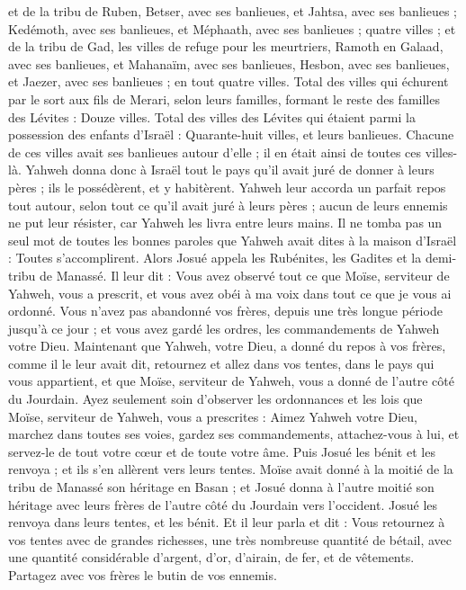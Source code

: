 \begin{multicols}{2}
et de la tribu de Ruben, Betser, avec ses banlieues, et Jahtsa, avec ses banlieues ;
Kedémoth, avec ses banlieues, et Méphaath, avec ses banlieues ; quatre villes ;
et de la tribu de Gad, les villes de refuge pour les meurtriers, Ramoth en Galaad, avec ses banlieues, et Mahanaïm, avec ses banlieues,
Hesbon, avec ses banlieues, et Jaezer, avec ses banlieues ; en tout quatre villes.
Total des villes qui échurent par le sort aux fils de Merari, selon leurs familles, formant le reste des familles des Lévites : Douze villes.
Total des villes des Lévites qui étaient parmi la possession des enfants d’Israël : Quarante-huit villes, et leurs banlieues.
Chacune de ces villes avait ses banlieues autour d’elle ; il en était ainsi de toutes ces villes-là.
Yahweh donna donc à Israël tout le pays qu’il avait juré de donner à leurs pères ; ils le possédèrent, et y habitèrent\FTNT{}.
Yahweh leur accorda un parfait repos tout autour, selon tout ce qu’il avait juré à leurs pères ; aucun de leurs ennemis ne put leur résister, car Yahweh les livra entre leurs mains.
Il ne tomba pas un seul mot de toutes les bonnes paroles que Yahweh avait dites à la maison d'Israël : Toutes s’accomplirent.
\VerseOne{}Alors Josué appela les Rubénites, les Gadites et la demi-tribu de Manassé.
Il leur dit : Vous avez observé tout ce que Moïse, serviteur de Yahweh, vous a prescrit, et vous avez obéi à ma voix dans tout ce que je vous ai ordonné.
Vous n’avez pas abandonné vos frères, depuis une très longue période jusqu’à ce jour ; et vous avez gardé les ordres, les commandements de Yahweh votre Dieu.
Maintenant que Yahweh, votre Dieu, a donné du repos à vos frères, comme il le leur avait dit, retournez et allez dans vos tentes, dans le pays qui vous appartient, et que Moïse, serviteur de Yahweh, vous a donné de l’autre côté du Jourdain.
Ayez seulement soin d’observer les ordonnances et les lois que Moïse, serviteur de Yahweh, vous a prescrites : Aimez Yahweh votre Dieu, marchez dans toutes ses voies, gardez ses commandements, attachez-vous à lui, et servez-le de tout votre cœur et de toute votre âme.
Puis Josué les bénit et les renvoya ; et ils s’en allèrent vers leurs tentes.
Moïse avait donné à la moitié de la tribu de Manassé son héritage en Basan ; et Josué donna à l’autre moitié son héritage avec leurs frères de l’autre côté du Jourdain vers l’occident. Josué les renvoya dans leurs tentes, et les bénit.
Et il leur parla et dit : Vous retournez à vos tentes avec de grandes richesses, une très nombreuse quantité de bétail, avec une quantité considérable d’argent, d’or, d’airain, de fer, et de vêtements. Partagez avec vos frères le butin de vos ennemis.

\end{multicols}

